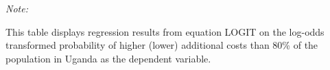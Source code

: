 \begin{table}[htbp!]
\begin{adjustbox}{width = 1\textwidth, max height = 0.95\textheight, center}
\begin{threeparttable}[b]
         \begin{tablenotes}\item \medskip \textit{Note:}
            \item This table displays regression results from equation LOGIT on the log-odds transformed probability of higher (lower) additional costs than 80\% of the population in Uganda as the dependent variable. 
         \end{tablenotes}
      \end{threeparttable}
   \end{adjustbox}
\end{table}


